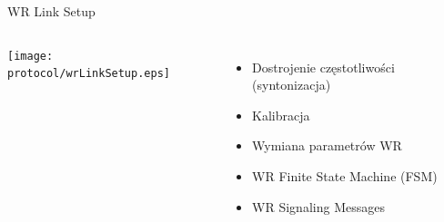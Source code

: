 \documentclass[compress,red]{beamer}
\begin{document}
\begin{frame}{WR Link Setup }

  \begin{columns}[c]

      \begin{center}
      \texttt{[image: protocol/wrLinkSetup.eps]}
      \end{center}



      \begin{itemize}
	\item Dostrojenie częstotliwości (syntonizacja)
	\item Kalibracja
	\item Wymiana parametrów WR
	\item WR Finite State Machine (FSM)
	\item WR Signaling Messages
      \end{itemize}

  \end{columns}

\end{frame}
% 
% 
% 
\end{document}
